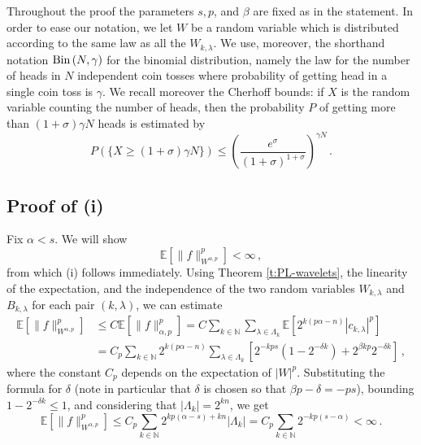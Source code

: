 \documentclass[11pt,reqno]{amsart}
\theoremstyle{definition}
\numberwithin{equation}{section}
\begin{document}
Throughout the proof the parameters $s,p$, and $\beta$ are fixed as in the statement. 
In order to ease our notation, we let $W$ be a random variable which is distributed according to the same law as all the $W_{k,\lambda}$. We use, moreover, the shorthand notation ${\rm Bin}\, (N, \gamma)$ for the binomial distribution, namely the law for the number of heads in $N$ independent coin tosses where probability of getting head in a single coin toss is $\gamma$. We recall moreover the Cherhoff bounds: if $X$ is the random variable counting the number of heads, then the probability $P$ of getting more than $(1+\sigma)\gamma N$ heads is estimated by
\begin{equation}\label{e:Chernoff}
P (\{X\geq (1+\sigma) \gamma N\}) \leq \left(\frac{e^\sigma}{(1+\sigma)^{1+\sigma}}\right)^{\gamma N}\, .
\end{equation}

\subsection{Proof of (i)} Fix $\alpha <s$. We will show
\begin{equation}\label{e:expectation-Wap}
\mathbb E \left[\|f\|_{W^{\alpha, p}}^p\right] < \infty\, ,
\end{equation}
from which (i) follows immediately.
Using Theorem \ref{t:PL-wavelets}, the linearity of the expectation, and the independence of the two random variables $W_{k,\lambda}$ and $B_{k, \lambda}$ for each pair $(k, \lambda)$, we can estimate 
\begin{align*}
\mathbb E \left[\|f\|_{W^{\alpha, p}}^p\right] &\leq C \mathbb E \left[ \|f\|^p_{\alpha, p} \right]
= C \sum_{k\in \mathbb N} \sum_{\lambda\in \Lambda_k} \mathbb E [2^{k (p \alpha -n)} |c_{k, \lambda}|^p]\\
&= C_p \sum_{k\in \mathbb N} 2^{k (p \alpha -n)} \sum_{\lambda \in \Lambda_k} [ 2^{-kp s} (1-2^{-\delta k}) + 2^{\beta k p} 2^{-\delta k}]\, ,
\end{align*}
where the constant $C_p$ depends on the expectation of $|W|^p$. 
Substituting the formula for $\delta$ (note in particular that $\delta$ is chosen so that $\beta p - \delta = -p s$), bounding $1-2^{-\delta k} \leq 1$, and considering that $|\Lambda_k|=2^{kn}$, we get 
\[
\mathbb E \left[\|f\|_{W^{\alpha, p}}^p\right] 
\leq C_p \sum_{k\in \mathbb N} 2^{kp (\alpha - s) + kn} |\Lambda_k|= C_p \sum_{k\in \mathbb N} 2^{-kp (s-\alpha)} < \infty\, .
\]
\end{document}
